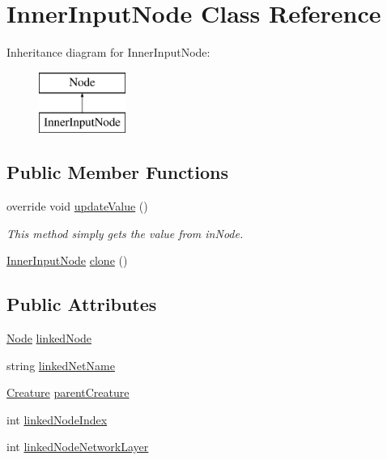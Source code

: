 \hypertarget{class_inner_input_node}{}\section{Inner\+Input\+Node Class Reference}
\label{class_inner_input_node}
Inheritance diagram for Inner\+Input\+Node\+:\begin{figure}[H]
\begin{center}
\leavevmode
\includegraphics[height=2.000000cm]{class_inner_input_node}
\end{center}
\end{figure}
\subsection*{Public Member Functions}
\begin{DoxyCompactItemize}
\item 
override void \mbox{\hyperlink{class_inner_input_node_ac67f9a1dcd0ae72d2d7fe4cfa7f91152}{update\+Value}} ()
\begin{DoxyCompactList}\small\item\em This method simply gets the value from in\+Node. \end{DoxyCompactList}\item 
\mbox{\hyperlink{class_inner_input_node}{Inner\+Input\+Node}} \mbox{\hyperlink{class_inner_input_node_ae5611efed948ab50400a6204319490a5}{clone}} ()
\end{DoxyCompactItemize}
\subsection*{Public Attributes}
\begin{DoxyCompactItemize}
\item 
\mbox{\hyperlink{class_node}{Node}} \mbox{\hyperlink{class_inner_input_node_a56ef3e3b3b66cac2a74094373a154fc6}{linked\+Node}}
\item 
string \mbox{\hyperlink{class_inner_input_node_a59c3f5f1aacedbf2bebab494d9e75f91}{linked\+Net\+Name}}
\item 
\mbox{\hyperlink{class_creature}{Creature}} \mbox{\hyperlink{class_inner_input_node_adfb709c73b39672d7bcecc0bed14ad5f}{parent\+Creature}}
\item 
int \mbox{\hyperlink{class_inner_input_node_a110568103ae4dc406276330d83be7fad}{linked\+Node\+Index}}
\item 
int \mbox{\hyperlink{class_inner_input_node_a839da78d668a0a301d7bb640ac431082}{linked\+Node\+Network\+Layer}}
\end{DoxyCompactItemize}


